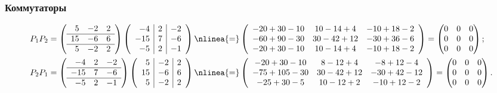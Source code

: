\begin{solution}
	\subsubsection{Коммутаторы}
		\begin{align*}
			P_1 P_2 &=
			\left(
				\begin{array}{rrr}
					5 & -2 & 2
					\\
					\hline
					15 & -6 & 6
					\\
					\hline
					5 & -2 & 2
				\end{array}
			\right)
			\left(
				\begin{array}{r|r|r}
					-4 & 2 & -2
					\\
					-15 & 7 & -6
					\\
					-5 & 2 & -1
				\end{array}
			\right)
			\nlinea{=}
			\left(
				\begin{array}{ccc}
					-20 + 30 - 10 &
					10 - 14 + 4 &
					-10 + 18 - 2
					\\
					-60 + 90 - 30 &
					30 - 42 + 12 &
					-30 + 36 - 6
					\\
					-20 + 30 - 10 &
					10 - 14 + 4 &
					-10 + 18 - 2
				\end{array}
			\right)
			=
			\begin{pmatrix}
				0 & 0 & 0 \\
				0 & 0 & 0 \\
				0 & 0 & 0
			\end{pmatrix}
			;
			\\
			P_2 P_1 &=
			\left(
				\begin{array}{rrr}
					-4 & 2 & -2
					\\
					\hline
					-15 & 7 & -6
					\\
					\hline
					-5 & 2 & -1
				\end{array}
			\right)
			\left(
				\begin{array}{r|r|r}
					5 & -2 & 2
					\\
					15 & -6 & 6
					\\
					5 & -2 & 2
				\end{array}
			\right)
			\nlinea{=}
			\left(
				\begin{array}{ccc}
					-20 + 30 - 10 &
					8 - 12 + 4 &
					-8 + 12 - 4
					\\
					-75 + 105 - 30 &
					30 - 42 + 12 &
					-30 + 42 - 12
					\\
					-25 + 30 - 5 &
					10 - 12 + 2 &
					-10 + 12 - 2
				\end{array}
			\right)
			=
			\begin{pmatrix}
				0 & 0 & 0 \\
				0 & 0 & 0 \\
				0 & 0 & 0
			\end{pmatrix}
			.
		\end{align*}


\end{solution}
